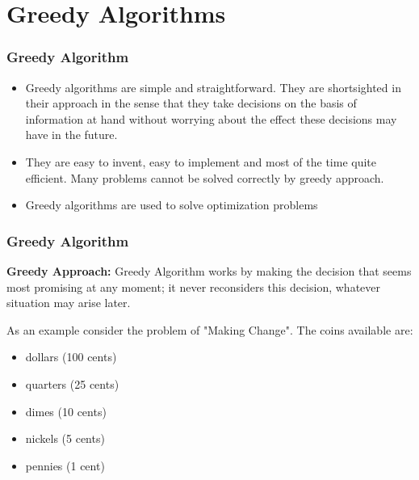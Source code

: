 \documentclass{beamer}
\begin{document}
\section{Greedy Algorithms}


\begin{frame}
	\frametitle{Greedy Algorithm}
	
	\large
	
	\begin{itemize}
		\item 	Greedy algorithms are simple and straightforward. They are shortsighted in their approach in the sense that they take decisions on the basis of information at hand without worrying about the effect these decisions may have in the future. 
		\item They are easy to invent, easy to implement and most of the time quite efficient. Many problems cannot be solved correctly by greedy approach. 
		\item Greedy algorithms are used to solve optimization problems
	\end{itemize}

	
	
\end{frame}
\begin{frame}
	\frametitle{Greedy Algorithm}
	
	\begin{framed}
	\textbf{Greedy Approach:} Greedy Algorithm works by making the decision that seems most promising at any moment; it never reconsiders this decision, whatever situation may arise later.
	\end{framed}
	

	As an example consider the problem of "Making Change". The coins available are:
	
	\begin{itemize}
		\item dollars (100 cents)
		\item quarters (25 cents)
		\item dimes (10 cents)
		\item nickels (5 cents)
		\item pennies (1 cent)
	\end{itemize}

	
	

	
\end{frame}
\end{document}
